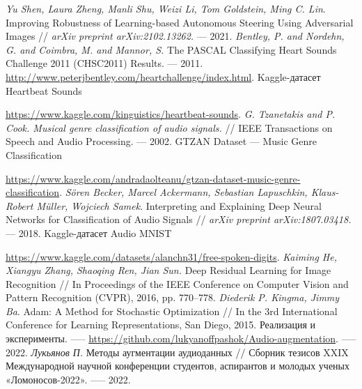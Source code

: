 \documentclass[12pt, fleqn]{article}
\begin{document}
\begin{thebibliography}{3}
	\textit{Yu Shen, Laura Zheng, Manli Shu, Weizi Li, Tom Goldstein, Ming C. Lin}. Improving Robustness of Learning-based Autonomous Steering Using Adversarial Images // \textit{arXiv preprint arXiv:2102.13262.} --- 2021.
	\textit{Bentley, P. and Nordehn, G. and Coimbra, M. and Mannor, S.} The {PASCAL} {C}lassifying {H}eart {S}ounds {C}hallenge 2011 {(CHSC2011)} {R}esults. --- 2011.
	\url{http://www.peterjbentley.com/heartchallenge/index.html}.
	Kaggle-датасет Heartbeat Sounds
	
	\url{https://www.kaggle.com/kinguistics/heartbeat-sounds}.
    \textit{G. Tzanetakis and P. Cook. Musical genre classification of audio signals.}    // IEEE Transactions on Speech and Audio Processing. --- 2002.
    GTZAN Dataset --- Music Genre Classification
    
    \url{https://www.kaggle.com/andradaolteanu/gtzan-dataset-music-genre-classification}.
    \textit{Sören Becker, Marcel Ackermann, Sebastian Lapuschkin, Klaus-Robert Müller, Wojciech Samek}. Interpreting and Explaining Deep Neural Networks for Classification of Audio Signals // \textit{arXiv preprint arXiv:1807.03418.} --- 2018.
    Kaggle-датасет Audio MNIST
    
    \url{https://www.kaggle.com/datasets/alanchn31/free-spoken-digits}.
    \textit{Kaiming He, Xiangyu Zhang, Shaoqing Ren, Jian Sun.} Deep Residual Learning for Image Recognition // In Proceedings of the IEEE Conference on Computer Vision and Pattern Recognition (CVPR), 2016, pp. 770--778.
	\textit{Diederik P. Kingma, Jimmy Ba}. Adam: A Method for Stochastic Optimization // In the 3rd International Conference for Learning Representations, San Diego, 2015.
	Реализация и эксперименты. —-- \url{https://github.com/lukyanoffpashok/Audio-augmentation}. —-- 2022.
	\textit{Лукьянов П.} Методы аугментации аудиоданных // Сборник тезисов XXIX Международной научной
    конференции студентов, аспирантов и молодых ученых «Ломоносов-2022». —-- 2022.
	
\end{thebibliography}
\end{document}

